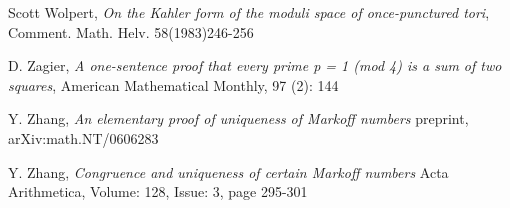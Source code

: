 \documentclass[12pt,a4paper]{amsart}
\begin{document}
Scott Wolpert,
\textit{On the Kahler form of the moduli space of once-punctured tori}, 
Comment. Math. Helv. 58(1983)246-256

D. Zagier,
 \textit{A one-sentence proof that every prime p = 1 (mod 4) is a sum of two squares}, 
 American Mathematical Monthly, 97 (2): 144
 
 Y. Zhang,
 \textit{ An elementary proof of uniqueness of Markoff numbers}
 preprint, arXiv:math.NT/0606283
 
   Y. Zhang,
 \textit{Congruence and uniqueness of certain Markoff numbers}
 Acta Arithmetica, Volume: 128, Issue: 3, page 295-301




%
%
%
%
%
%
%
%



% 
 
\end{document}
